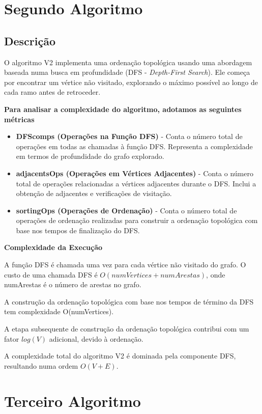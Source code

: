 \documentclass{report}
\begin{document}
\section{Segundo Algoritmo}

\subsection{Descrição}

O algoritmo V2 implementa uma ordenação topológica usando uma abordagem baseada numa busca em profundidade (DFS - \textit{Depth-First Search}). Ele começa por encontrar um vértice não visitado, explorando o máximo possível ao longo de cada ramo antes de retroceder.

\textbf{Para analisar a complexidade do algoritmo, adotamos as seguintes métricas}

 \begin{itemize}
            \item \textbf{DFScomps (Operações na Função DFS)} - Conta o número total de operações em todas as chamadas à função DFS. Representa a complexidade em termos de profundidade do grafo explorado.
            \item \textbf{adjacentsOps (Operações em Vértices Adjacentes)} - Conta o número total de operações relacionadas a vértices adjacentes durante o DFS. Inclui a obtenção de adjacentes e verificações de visitação.
            \item \textbf{sortingOps (Operações de Ordenação)} - Conta o número total de operações de ordenação realizadas para construir a ordenação topológica com base nos tempos de finalização do DFS.
\end{itemize}

\textbf{Complexidade da Execução}

A função DFS é chamada uma vez para cada vértice não visitado do grafo. O custo de uma chamada DFS é \(O(numVertices + numArestas)\), onde numArestas é o número de arestas no grafo.

A construção da ordenação topológica com base nos tempos de término da DFS tem complexidade O(numVertices).

A etapa subsequente de construção da ordenação topológica contribui com um fator \(log(V)\) adicional, devido à ordenação.

A complexidade total do algoritmo V2 é dominada pela componente DFS, resultando numa ordem \(O(V + E)\).

\section{Terceiro Algoritmo}
\end{document}
